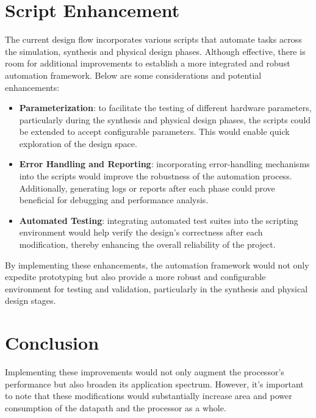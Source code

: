 \section{Script Enhancement}
The current design flow incorporates various scripts that automate tasks across the simulation, synthesis and physical design phases. Although effective, there is room for additional improvements to establish a more integrated and robust automation framework. Below are some considerations and potential enhancements:

\begin{itemize}
    \item \textbf{Parameterization}: to facilitate the testing of different hardware parameters, particularly during the synthesis and physical design phases, the scripts could be extended to accept configurable parameters. This would enable quick exploration of the design space.

    \item \textbf{Error Handling and Reporting}: incorporating error-handling mechanisms into the scripts would improve the robustness of the automation process. Additionally, generating logs or reports after each phase could prove beneficial for debugging and performance analysis.

    \item \textbf{Automated Testing}: integrating automated test suites into the scripting environment would help verify the design's correctness after each modification, thereby enhancing the overall reliability of the project.
\end{itemize}

By implementing these enhancements, the automation framework would not only expedite prototyping but also provide a more robust and configurable environment for testing and validation, particularly in the synthesis and physical design stages.

\section{Conclusion}
Implementing these improvements would not only augment the processor's performance but also broaden its application spectrum. However, it's important to note that these modifications would substantially increase area and power consumption of the datapath and the processor as a whole.